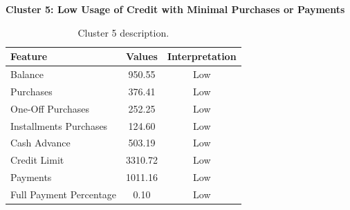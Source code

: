 \begin{center}
\centering
\textbf{Cluster 5: Low Usage of Credit with Minimal Purchases or Payments}
\begin{table}[H]
\centering
\begin{tabular}{|l|c|c|}
\hline
\textbf{Feature} & \textbf{Values} & \textbf{Interpretation} \\ \hline
Balance & 950.55 & Low \\ \hline
Purchases & 376.41 & Low \\ \hline
One-Off Purchases & 252.25 & Low \\ \hline
Installments Purchases & 124.60 & Low \\ \hline
Cash Advance & 503.19 & Low \\ \hline
Credit Limit & 3310.72 & Low \\ \hline
Payments & 1011.16 & Low \\ \hline
Full Payment Percentage & 0.10 & Low \\ \hline
\end{tabular}
\caption{Cluster 5 description.}
\end{table}
\end{center}

